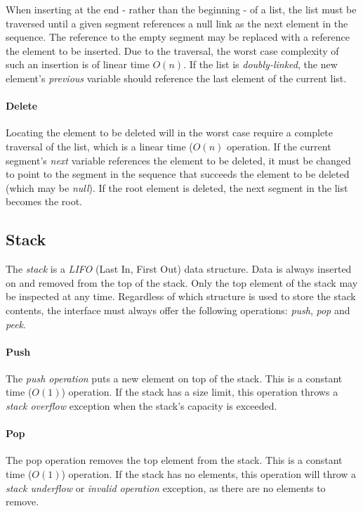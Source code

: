 \documentclass{article}
\begin{document}
When inserting at the end - rather than the beginning - of a list,
the list must be traversed until a given segment references a null link as the next element in the sequence.
The reference to the empty segment may be replaced with a reference the element to be inserted.
Due to the traversal, the worst case complexity of such an insertion is of linear time \(O(n)\).
If the list is {\em doubly-linked}, the new element's {\em previous} variable should reference
the last element of the current list.

\paragraph{Delete}
Locating the element to be deleted will in the worst case require a complete traversal of the list,
which is a linear time (\(O(n)\) operation. If the current segment's {\em next} variable references
the element to be deleted, it must be changed to point to the segment in the sequence that succeeds
the element to be deleted (which may be {\em null}). If the root element is deleted,
the next segment in the list becomes the root.


\newpage


\subsection{Stack}
The {\em stack} is a {\em LIFO} (Last In, First Out) data structure.
Data is always inserted on and removed from the top of the stack.
Only the top element of the stack may be inspected at any time.
Regardless of which structure is used to store the stack contents,
the interface must always offer the following operations: {\em push}, {\em pop} and {\em peek}.

\paragraph{Push}
The {\em push operation} puts a new element on top of the stack. This is a constant time (\(O(1)\)) operation.
If the stack has a size limit, this operation throws a {\em stack overflow} exception
when the stack's capacity is exceeded.

\paragraph{Pop}
The pop operation removes the top element from the stack. This is a constant time (\(O(1)\)) operation.
If the stack has no elements, this operation will throw a {\em stack underflow} or {\em invalid operation}
exception, as there are no elements to remove.
\end{document}
